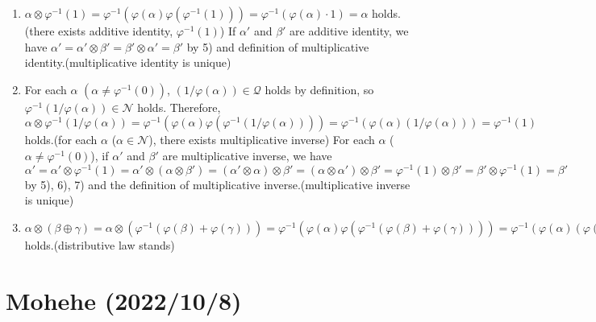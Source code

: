 \documentclass{article}
\newcommand\N{\mathcal N}
\newcommand\Q{\mathcal Q}
\begin{document}
\begin{enumerate}[label = (\alph*)]
\begin{enumerate}[label = \arabic*)]
      \item $\alpha \otimes \varphi^{-1}(1) = \varphi^{-1}(\varphi(\alpha)\varphi(\varphi^{-1}(1))) = \varphi^{-1}(\varphi(\alpha)\cdot1) = \alpha$ holds.(there exists additive identity, $\varphi^{-1}(1)$)
        If $\alpha'$ and $\beta'$ are additive identity, we have $\alpha' = \alpha' \otimes \beta' = \beta' \otimes \alpha' = \beta'$ by 5) and definition of multiplicative identity.(multiplicative identity is unique)
      \item For each $\alpha$ $(\alpha \neq \varphi^{-1}(0))$, $(1/\varphi(\alpha))\in\Q$ holds by definition, so $\varphi^{-1}(1/\varphi(\alpha)) \in \N$ holds. Therefore, $\alpha \otimes \varphi^{-1}(1/\varphi(\alpha)) = \varphi^{-1}(\varphi(\alpha)\varphi(\varphi^{-1}(1/\varphi(\alpha)))) = \varphi^{-1}(\varphi(\alpha)(1/\varphi(\alpha))) = \varphi^{-1}(1)$ holds.(for each $\alpha$ ($\alpha \in \N$), there exists multiplicative inverse)
        For each $\alpha$ ($\alpha \neq \varphi^{-1}(0)$), if $\alpha'$ and $\beta'$ are multiplicative inverse, we have $\alpha' = \alpha' \otimes \varphi^{-1}(1) = \alpha' \otimes (\alpha \otimes \beta') = (\alpha' \otimes \alpha) \otimes \beta' = (\alpha \otimes \alpha') \otimes \beta' = \varphi^{-1}(1) \otimes \beta' = \beta' \otimes \varphi^{-1}(1) = \beta'$ by 5), 6), 7) and the definition of multiplicative inverse.(multiplicative inverse is unique) 
      \item $\alpha \otimes (\beta \oplus \gamma) = \alpha \otimes (\varphi^{-1}(\varphi(\beta) + \varphi(\gamma))) = \varphi^{-1}(\varphi(\alpha)\varphi(\varphi^{-1}(\varphi(\beta) + \varphi(\gamma)))) = \varphi^{-1}(\varphi(\alpha)(\varphi(\beta) + \varphi(\gamma))) = \varphi^{-1}(\varphi(\alpha)\varphi(\beta) + \varphi(\alpha)\varphi(\gamma)) = \varphi^{-1}(\varphi(\varphi^{-1}(\varphi(\alpha)\varphi(\beta))) + \varphi(\varphi^{-1}(\varphi(\alpha)\varphi(\gamma)))) = \varphi^{-1}(\varphi(\alpha \otimes \beta) + \varphi(\alpha \otimes \gamma)) = \alpha \otimes \beta \oplus \alpha \otimes \gamma$ holds.(distributive law stands)
    \end{enumerate}
\end{enumerate}

\section{Mohehe (2022/10/8)}
\end{document}
